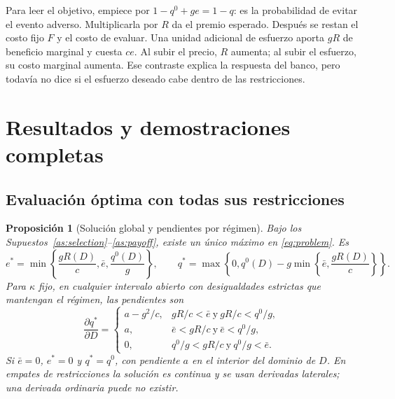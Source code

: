 \documentclass[11pt]{article}
\newtheorem{proposition}{Proposición}
\theoremstyle{definition}\newtheorem{assumption}{Supuesto}
\begin{document}
Para leer el objetivo, empiece por $1-q^0+ge=1-q$: es la probabilidad de
evitar el evento adverso. Multiplicarla por $R$ da el premio esperado. Después
se restan el costo fijo $F$ y el costo de evaluar. Una unidad adicional de
esfuerzo aporta $gR$ de beneficio marginal y cuesta $ce$. Al subir el precio,
$R$ aumenta; al subir el esfuerzo, su costo marginal aumenta. Ese contraste
explica la respuesta del banco, pero todavía no dice si el esfuerzo deseado
cabe dentro de las restricciones.

\section{Resultados y demostraciones completas}
\subsection{Evaluación óptima con todas sus restricciones}
\begin{proposition}[Solución global y pendientes por régimen]\label{p:global}
Bajo los Supuestos~\ref{as:selection}--\ref{as:payoff}, existe un único máximo
en \eqref{eq:problem}. Es
\begin{equation}\label{eq:opt}
e^*=\min\left\{\frac{gR(D)}c,\bar e,\frac{q^0(D)}g\right\},\qquad
q^*=\max\left\{0,q^0(D)-g\min\left\{\bar e,\frac{gR(D)}c\right\}\right\}.
\end{equation}
Para $\kappa$ fijo, en cualquier intervalo abierto con desigualdades estrictas
que mantengan el régimen, las pendientes son
\begin{equation}\label{eq:regimes}
\frac{\partial q^*}{\partial D}=
\begin{cases}
a-g^2/c,&gR/c<\bar e\ \text{y}\ gR/c<q^0/g,\\
a,&\bar e<gR/c\ \text{y}\ \bar e<q^0/g,\\
0,&q^0/g<gR/c\ \text{y}\ q^0/g<\bar e.
\end{cases}
\end{equation}
Si $\bar e=0$, $e^*=0$ y $q^*=q^0$, con pendiente $a$ en el interior del
dominio de $D$. En empates de restricciones la solución es continua y se usan
derivadas laterales; una derivada ordinaria puede no existir.
\end{proposition}
\end{document}
